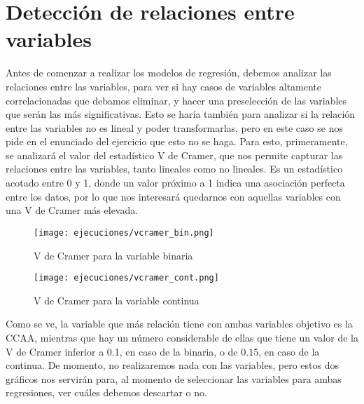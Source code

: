 \documentclass[a4paper,onecolumn]{extarticle}
\begin{document}
\begin{sloppypar}
\section{Detección de relaciones entre variables}\label{relaciones}
Antes de comenzar a realizar los modelos de regresión, debemos analizar las relaciones entre las variables, para ver si hay casos de variables altamente 
correlacionadas que debamos eliminar, y hacer una preselección de las variables que serán las más significativas. Esto se haría también para analizar si la 
relación entre las variables no es lineal y poder transformarlas, pero en este caso se nos pide en el enunciado del ejercicio que esto no se haga. Para esto,
primeramente, se analizará el valor del estadístico V de Cramer, que nos permite capturar las relaciones entre las variables, tanto lineales como no lineales. 
Es un estadístico acotado entre 0 y 1, donde un valor próximo a 1 indica una asociación perfecta entre los datos, por lo que nos interesará quedarnos con aquellas 
variables con una V de Cramer más elevada.
\begin{figure}[h!]
    \centering
    \begin{minipage}{0.5\textwidth}
        \centering
        \texttt{[image: ejecuciones/vcramer\_bin.png]}
        \caption{V de Cramer para la variable binaria}
        \label{fig:cramerbin}
    \end{minipage}%
    \begin{minipage}{0.5\textwidth}
        \centering
        \texttt{[image: ejecuciones/vcramer\_cont.png]}
        \caption{V de Cramer para la variable continua}
        \label{fig:cramercont}
    \end{minipage}
\end{figure}

Como se ve, la variable que más relación tiene con ambas variables objetivo es la CCAA, mientras que hay un número considerable de ellas que tiene un valor de 
la V de Cramer inferior a 0.1, en caso de la binaria, o de 0.15, en caso de la continua. De momento, no realizaremos nada con las variables, pero estos dos 
gráficos nos servirán para, al momento de seleccionar las variables para ambas regresiones, ver cuáles debemos descartar o no.


\end{sloppypar}
\end{document}
